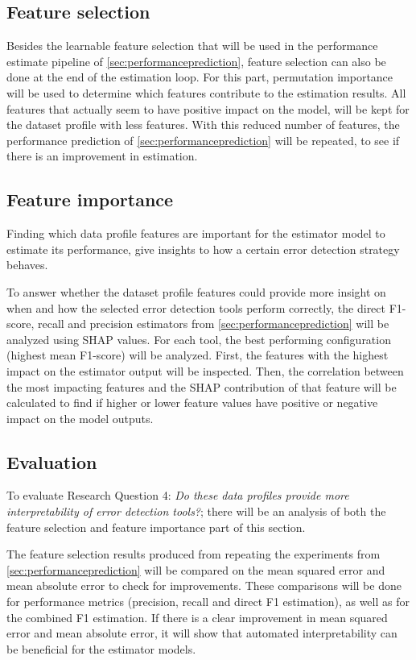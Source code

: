 \subsection{Feature selection}
\label{subsec:featureselection}
Besides the learnable feature selection that will be used in the performance estimate pipeline of \autoref{sec:performanceprediction}, feature selection can also be done at the end of the estimation loop. For this part, permutation importance will be used to determine which features contribute to the estimation results. All features that actually seem to have positive impact on the model, will be kept for the dataset profile with less features. With this reduced number of features, the performance prediction of \autoref{sec:performanceprediction} will be repeated, to see if there is an improvement in estimation.

\subsection{Feature importance}
Finding which data profile features are important for the estimator model to estimate its performance, give insights to how a certain error detection strategy behaves.

To answer whether the dataset profile features could provide more insight on when and how the selected error detection tools perform correctly, the direct F1-score, recall and precision estimators from \autoref{sec:performanceprediction} will be analyzed using SHAP values. For each tool, the best performing configuration (highest mean F1-score) will be analyzed. First, the features with the highest impact on the estimator output will be inspected. Then, the correlation between the most impacting features and the SHAP contribution of that feature will be calculated to find if higher or lower feature values have positive or negative impact on the model outputs. 

\subsection{Evaluation}
To evaluate Research Question 4: \textit{Do these data profiles provide more interpretability of error detection tools?};
there will be an analysis of both the feature selection and feature importance part of this section. 

The feature selection results produced from repeating the experiments from \autoref{sec:performanceprediction} will be compared on the mean squared error and mean absolute error to check for improvements. These comparisons will be done for performance metrics (precision, recall and direct F1 estimation), as well as for the combined F1 estimation.
If there is a clear improvement in mean squared error and mean absolute error, it will show that automated interpretability can be beneficial for the estimator models.

